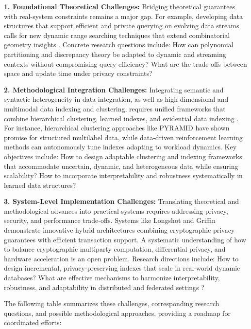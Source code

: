 \documentclass[sigconf]{acmart}
\begin{document}
\textbf{1. Foundational Theoretical Challenges:} Bridging theoretical guarantees with real-system constraints remains a major gap. For example, developing data structures that support efficient and private querying on evolving data streams calls for new dynamic range searching techniques that extend combinatorial geometry insights \cite{ref1,ref2,ref8}. Concrete research questions include: How can polynomial partitioning and discrepancy theory be adapted to dynamic and streaming contexts without compromising query efficiency? What are the trade-offs between space and update time under privacy constraints?

\textbf{2. Methodological Integration Challenges:} Integrating semantic and syntactic heterogeneity in data integration, as well as high-dimensional and multimodal data indexing and clustering, requires unified frameworks that combine hierarchical clustering, learned indexes, and evidential data indexing \cite{ref16,ref17,ref30}. For instance, hierarchical clustering approaches like PYRAMID \cite{ref17} have shown promise for structured multilabel data, while data-driven reinforcement learning methods \cite{ref33} can autonomously tune indexes adapting to workload dynamics. Key objectives include: How to design adaptable clustering and indexing frameworks that accommodate uncertain, dynamic, and heterogeneous data while ensuring scalability? How to incorporate interpretability and robustness systematically in learned data structures?

\textbf{3. System-Level Implementation Challenges:} Translating theoretical and methodological advances into practical systems requires addressing privacy, security, and performance trade-offs. Systems like Longshot \cite{ref28} and Griffin \cite{ref35} demonstrate innovative hybrid architectures combining cryptographic privacy guarantees with efficient transaction support. A systematic understanding of how to balance cryptographic multiparty computation, differential privacy, and hardware acceleration is an open problem. Research directions include: How to design incremental, privacy-preserving indexes that scale in real-world dynamic databases? What are effective mechanisms to harmonize interpretability, robustness, and adaptability in distributed and federated settings \cite{ref22,ref23}?

The following table summarizes these challenges, corresponding research questions, and possible methodological approaches, providing a roadmap for coordinated efforts:
\end{document}
